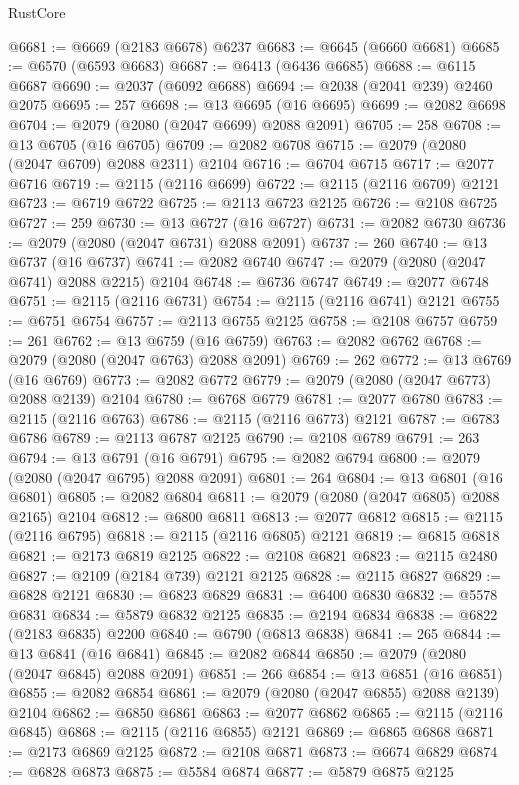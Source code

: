 \begin{lexlean}{RustCore}
\begin{coremodule}
@6681 := @6669 (@2183 @6678) @6237
@6683 := @6645 (@6660 @6681)
@6685 := @6570 (@6593 @6683)
@6687 := @6413 (@6436 @6685)
@6688 := @6115 @6687
@6690 := @2037 (@6092 @6688)
@6694 := @2038 (@2041 @239) @2460 @2075
@6695 := 257
@6698 := @13 @6695 (@16 @6695)
@6699 := @2082 @6698
@6704 := @2079 (@2080 (@2047 @6699) @2088 @2091)
@6705 := 258
@6708 := @13 @6705 (@16 @6705)
@6709 := @2082 @6708
@6715 := @2079 (@2080 (@2047 @6709) @2088 @2311) @2104
@6716 := @6704 @6715
@6717 := @2077 @6716
@6719 := @2115 (@2116 @6699)
@6722 := @2115 (@2116 @6709) @2121
@6723 := @6719 @6722
@6725 := @2113 @6723 @2125
@6726 := @2108 @6725
@6727 := 259
@6730 := @13 @6727 (@16 @6727)
@6731 := @2082 @6730
@6736 := @2079 (@2080 (@2047 @6731) @2088 @2091)
@6737 := 260
@6740 := @13 @6737 (@16 @6737)
@6741 := @2082 @6740
@6747 := @2079 (@2080 (@2047 @6741) @2088 @2215) @2104
@6748 := @6736 @6747
@6749 := @2077 @6748
@6751 := @2115 (@2116 @6731)
@6754 := @2115 (@2116 @6741) @2121
@6755 := @6751 @6754
@6757 := @2113 @6755 @2125
@6758 := @2108 @6757
@6759 := 261
@6762 := @13 @6759 (@16 @6759)
@6763 := @2082 @6762
@6768 := @2079 (@2080 (@2047 @6763) @2088 @2091)
@6769 := 262
@6772 := @13 @6769 (@16 @6769)
@6773 := @2082 @6772
@6779 := @2079 (@2080 (@2047 @6773) @2088 @2139) @2104
@6780 := @6768 @6779
@6781 := @2077 @6780
@6783 := @2115 (@2116 @6763)
@6786 := @2115 (@2116 @6773) @2121
@6787 := @6783 @6786
@6789 := @2113 @6787 @2125
@6790 := @2108 @6789
@6791 := 263
@6794 := @13 @6791 (@16 @6791)
@6795 := @2082 @6794
@6800 := @2079 (@2080 (@2047 @6795) @2088 @2091)
@6801 := 264
@6804 := @13 @6801 (@16 @6801)
@6805 := @2082 @6804
@6811 := @2079 (@2080 (@2047 @6805) @2088 @2165) @2104
@6812 := @6800 @6811
@6813 := @2077 @6812
@6815 := @2115 (@2116 @6795)
@6818 := @2115 (@2116 @6805) @2121
@6819 := @6815 @6818
@6821 := @2173 @6819 @2125
@6822 := @2108 @6821
@6823 := @2115 @2480
@6827 := @2109 (@2184 @739) @2121 @2125
@6828 := @2115 @6827
@6829 := @6828 @2121
@6830 := @6823 @6829
@6831 := @6400 @6830
@6832 := @5578 @6831
@6834 := @5879 @6832 @2125
@6835 := @2194 @6834
@6838 := @6822 (@2183 @6835) @2200
@6840 := @6790 (@6813 @6838)
@6841 := 265
@6844 := @13 @6841 (@16 @6841)
@6845 := @2082 @6844
@6850 := @2079 (@2080 (@2047 @6845) @2088 @2091)
@6851 := 266
@6854 := @13 @6851 (@16 @6851)
@6855 := @2082 @6854
@6861 := @2079 (@2080 (@2047 @6855) @2088 @2139) @2104
@6862 := @6850 @6861
@6863 := @2077 @6862
@6865 := @2115 (@2116 @6845)
@6868 := @2115 (@2116 @6855) @2121
@6869 := @6865 @6868
@6871 := @2173 @6869 @2125
@6872 := @2108 @6871
@6873 := @6674 @6829
@6874 := @6828 @6873
@6875 := @5584 @6874
@6877 := @5879 @6875 @2125

\end{coremodule}
\end{lexlean}
